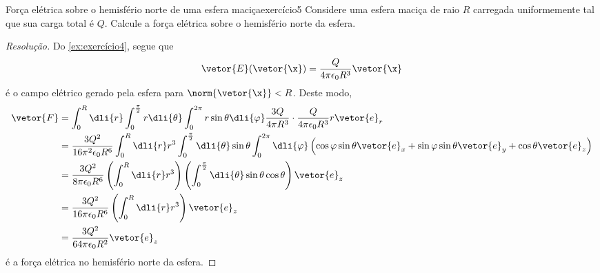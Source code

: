 \begin{exercício}{Força elétrica sobre o hemisfério norte de uma esfera maciça}{exercício5}
    Considere uma esfera maciça de raio \(R\) carregada uniformemente tal que sua carga total é \(Q\). Calcule a força elétrica sobre o hemisfério norte da esfera.
\end{exercício}
\begin{proof}[Resolução]
    Do \cref{ex:exercício4}, segue que
    \begin{equation*}
        \vetor{E}(\vetor{\x}) = \frac{Q}{4\pi \epsilon_0 R^3}\vetor{\x}
    \end{equation*}
    é o campo elétrico gerado pela esfera para \(\norm{\vetor{\x}} < R\). Deste modo,
    \begin{align*}
        \vetor{F} &= \int_0^R\dli{r} \int_0^\frac{\pi}{2} r\dli{\theta} \int_0^{2\pi} r\sin\theta \dli{\varphi} \frac{3Q}{4\pi R^3}\cdot\frac{Q}{4\pi \epsilon_0 R^3}r\vetor{e}_r\\
                  &= \frac{3Q^2}{16\pi^2 \epsilon_0 R^6}\int_{0}^{R} \dli{r} r^3\int_0^{\frac{\pi}{2}}\dli{\theta} \sin\theta \int_0^{2\pi} \dli{\varphi} \left(\cos\varphi \sin\theta \vetor{e}_x + \sin\varphi\sin\theta \vetor{e}_y + \cos\theta\vetor{e}_z\right)\\
                  &= \frac{3Q^2}{8\pi \epsilon_0 R^6} \left(\int_0^R\dli{r} r^3\right)\left(\int_{0}^{\frac{\pi}{2}}\dli{\theta} \sin\theta \cos\theta\right) \vetor{e}_z\\
                  &= \frac{3Q^2}{16\pi \epsilon_0 R^6} \left(\int_0^R\dli{r} r^3\right)\vetor{e}_z\\
                  &= \frac{3Q^2}{64\pi \epsilon_0 R^2} \vetor{e}_z
    \end{align*}
    é a força elétrica no hemisfério norte da esfera.
\end{proof}
